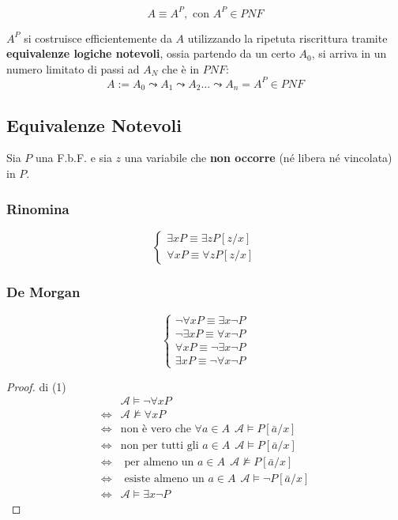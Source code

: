 $$
A \equiv A^P, \text{ con } A^P \in PNF
$$

$A^P$ si costruisce efficientemente da $A$ utilizzando la ripetuta riscrittura tramite 
\textbf{equivalenze logiche notevoli}, ossia partendo da un certo 
$A_0$, si arriva in un numero limitato di passi ad $A_N$ che è in $PNF$: 
$$
A := A_0 \leadsto A_1 \leadsto A_2 \ldots \leadsto A_n = A^P \in PNF
$$

\subsection{Equivalenze Notevoli}
Sia $P$ una F.b.F. e sia $z$ una variabile che \textbf{non occorre} (né libera 
né vincolata) in $P$. 

\subsubsection{Rinomina}
\label{rinomina}
\[
\begin{cases}
  \exists x P \equiv \exists z P[z/x] \\
  \forall x P \equiv \forall z P[z/x]
\end{cases}
\]
\subsubsection{De Morgan}
\[
\begin{cases}
  \neg \forall x P \equiv \exists x \neg P \\
  \neg \exists x P \equiv \forall x \neg P \\
  \forall x P \equiv \neg \exists x \neg P \\
  \exists x P \equiv \neg \forall x \neg P
\end{cases}
\]
\begin{proof}{di (1)}
  \begin{align*}
    & \mathscr{A} \models \neg \forall x P \\
    \iff & \mathscr{A} \nvDash \forall x P \\
    \iff & \text{non è vero che } \forall a \in A ~~ \mathscr{A} \models P[\bar{a}/x] \\
    \iff & \text{non per tutti gli } a \in A ~~ \mathscr{A} \models P[\bar{a}/x] \\
    \iff & \text{ per almeno un } a \in A ~~ \mathscr{A} \nvDash P[\bar{a}/x] \\
    \iff & \text{ esiste almeno un } a \in A ~~ \mathscr{A} \models \neg P[\bar{a}/x] \\
    \iff & \mathscr{A} \models \exists x \neg P 
  \end{align*}
\end{proof}

